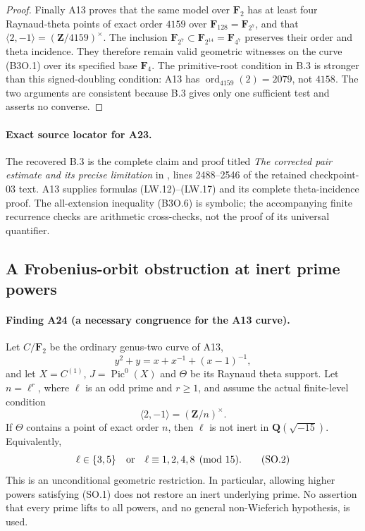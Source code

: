 \documentclass[11pt,a4paper]{article}
\begin{document}
\begin{proof}
Finally A13 proves that the same model over $\mathbf F_2$
has at least four Raynaud-theta points of exact order
$4159$ over $\mathbf F_{128}=\mathbf F_{2^7}$, and that
$\langle2,-1\rangle=(\mathbf Z/4159)^\times$.
The inclusion
$\mathbf F_{2^7}\subset\mathbf F_{2^{14}}=\mathbf F_{4^7}$
preserves their order and theta incidence.  They therefore
remain valid geometric witnesses on the curve (B3O.1)
over its specified base $\mathbf F_4$.
The primitive-root condition in B.3 is stronger than this
signed-doubling condition: A13 has
$\operatorname{ord}_{4159}(2)=2079$, not $4158$.
The two arguments are consistent because B.3 gives only
one sufficient test and asserts no converse.
\end{proof}

\paragraph{Exact source locator for A23.}
The recovered B.3 is the complete claim and proof titled
\emph{The corrected pair estimate and its precise limitation}
in , lines 2488--2546 of the
retained checkpoint-03 text.  A13 supplies formulas
(LW.12)--(LW.17) and its complete theta-incidence proof.
The all-extension inequality (B3O.6) is symbolic; the
accompanying finite recurrence checks are arithmetic
cross-checks, not the proof of its universal quantifier.


\subsection{A Frobenius-orbit obstruction at inert prime powers}
\label{sec:frobenius-sidon}

\paragraph{Finding A24 (a necessary congruence for the A13 curve).}
Let $C/\mathbf F_2$ be the ordinary genus-two curve of A13,
\[
             y^2+y=x+x^{-1}+(x-1)^{-1},
\]
and let $X=C^{(1)}$, $J=\operatorname{Pic}^0(X)$ and $\Theta$
be its Raynaud theta support.  Let $n=\ell^r$, where $\ell$
is an odd prime and $r\ge1$, and assume the actual finite-level
condition
\[
                   \langle2,-1\rangle=(\mathbf Z/n)^\times.
                                                        \tag{SO.1}
\]
If $\Theta$ contains a point of exact order $n$, then $\ell$
is not inert in $\mathbf Q(\sqrt{-15})$.  Equivalently,
\[
        \ell\in\{3,5\}\quad\hbox{or}\quad
                    \ell\equiv1,2,4,8\pmod {15}.          \tag{SO.2}
\]
This is an unconditional geometric restriction.  In particular,
allowing higher powers satisfying (SO.1) does not restore an
inert underlying prime.  No assertion that every prime lifts to
all powers, and no general non-Wieferich hypothesis, is used.
\end{document}
